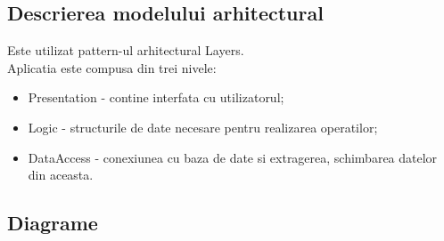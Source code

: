 \documentclass[11pt,a4paper,twoside,notitlepage]{article}
\begin{document}
\subsection{Descrierea modelului arhitectural}
Este utilizat pattern-ul arhitectural Layers.\\
Aplicatia este compusa din trei nivele: 
\begin{itemize}
	\item Presentation - contine interfata cu utilizatorul; 
	\item Logic - structurile de date necesare pentru realizarea operatilor;
	\item DataAccess - conexiunea cu baza de date si extragerea, schimbarea datelor din aceasta.
\end{itemize}

\subsection{Diagrame}
\end{document}
